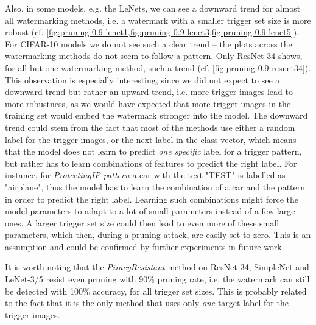 Also, in some models, e.g. the LeNets, we can see a downward trend for almost all watermarking methods, i.e. a watermark with a smaller trigger set size is more robust (cf. \cref{fig:pruning-0.9-lenet1,fig:pruning-0.9-lenet3,fig:pruning-0.9-lenet5}). For CIFAR-10 models we do not see such a clear trend --  the plots across the watermarking methods do not seem to follow a pattern. Only ResNet-34 shows, for all but one watermarking method, such a trend (cf. \cref{fig:pruning-0.9-resnet34}). This observation is especially interesting, since we did not expect to see a downward trend but rather an upward trend, i.e. more trigger images lead to more robustness, as we would have expected that more trigger images in the training set would embed the watermark stronger into the model.
The downward trend could stem from the fact that most of the methods use either a random label for the trigger images, or the next label in the class vector, which means that the model does not learn to predict \textit{one specific} label for a trigger pattern, but rather has to learn combinations of features to predict the right label. For instance, for \textit{ProtectingIP-pattern} a car with the text "TEST" is labelled as "airplane", thus the model has to learn the combination of a car and the pattern in order to predict the right label. Learning such combinations might force the model parameters to adapt to a lot of small parameters instead of a few large ones. A larger trigger set size could then lead to even more of these small parameters, which then, during a pruning attack, are easily set to zero.
This is an assumption and could be confirmed by further experiments in future work.



It is worth noting that the \textit{PiracyResistant} method on ResNet-34, SimpleNet and LeNet-3/5 resist even pruning with 90\% pruning rate, i.e. the watermark can still be detected with 100\% accuracy, for all trigger set sizes. This is probably related to the fact that it is the only method that uses only \textit{one} target label for the trigger images.

